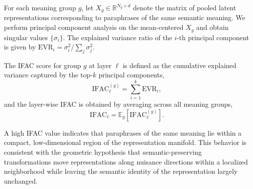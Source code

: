 For each meaning group $g$, let $X_g \in \mathbb{R}^{N_g \times d}$ denote the matrix of pooled latent representations corresponding to paraphrases of the same semantic meaning. We perform principal component analysis on the mean-centered $X_g$ and obtain singular values $\{\sigma_i\}$. The explained variance ratio of the $i$-th principal component is given by
\(
\mathrm{EVR}_i = \sigma_i^2 / \sum_j \sigma_j^2.
\)

The IFAC score for group $g$ at layer $\ell$ is defined as the cumulative explained variance captured by the top-$k$ principal components,
\begin{equation}
\text{IFAC}_\ell^{(g)} =
\sum_{i=1}^{k} \mathrm{EVR}_i,
\end{equation}
and the layer-wise IFAC is obtained by averaging across all meaning groups,
\begin{equation}
\text{IFAC}_\ell =
\mathbb{E}_g\!\left[\text{IFAC}_\ell^{(g)}\right].
\end{equation}

A high IFAC value indicates that paraphrases of the same meaning lie within a compact, low-dimensional region of the representation manifold. This behavior is consistent with the geometric hypothesis that semantic-preserving transformations move representations along nuisance directions within a localized neighborhood while leaving the semantic identity of the representation largely unchanged.